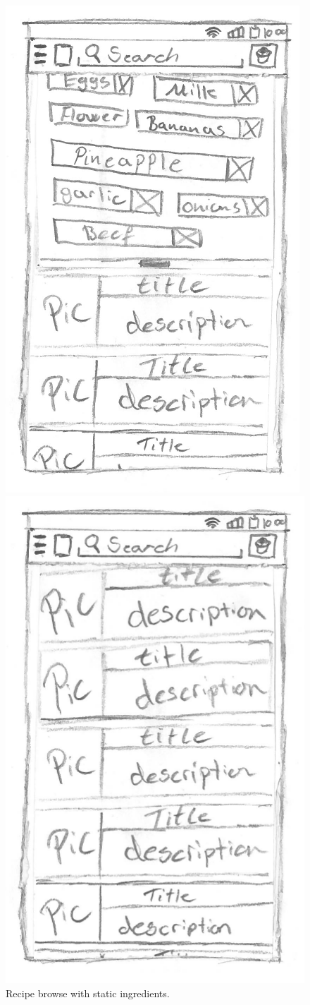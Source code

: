 \begin{figure}[H]
\begin{minipage}[b]{0.5\columnwidth}
\centering
\includegraphics[width=0.7\columnwidth]{img/prototypes/recipe_browse2.pdf}
\caption{Recipe browse with static ingredients\label{fig:recipestatic}.}
\end{minipage}
\hspace{0.5cm}
\begin{minipage}[b]{0.5\columnwidth}
\centering
\includegraphics[width=0.7\columnwidth]{img/prototypes/recipe_browse3.pdf}

\end{minipage}
\end{figure}
